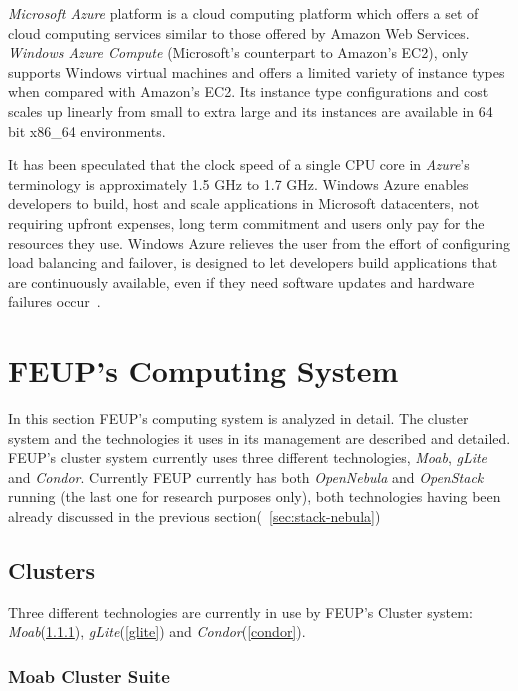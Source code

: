 \textit{Microsoft Azure} platform is a cloud computing platform which offers a set of cloud computing services similar to those offered by Amazon Web Services. \textit{Windows Azure Compute} (Microsoft's counterpart to Amazon's EC2), only supports Windows virtual machines and offers a limited variety of instance types when compared with Amazon's EC2. Its instance type configurations and cost scales up linearly from small to extra large and its instances are available in 64 bit x86\_64 environments. 

It has been speculated that the clock speed of a single CPU core in \textit{Azure}'s terminology is approximately 1.5 GHz to 1.7 GHz.\cite{azure-paper}
Windows Azure enables developers to build, host and scale applications in Microsoft datacenters, not requiring upfront expenses, long term commitment and users only pay for the resources they use. 
Windows Azure relieves the user from the effort of configuring load balancing and failover, is designed to let developers build applications that are continuously available, even if they need software updates and hardware failures occur~\cite{azure}.

\section{FEUP's Computing System}\label{feup}

In this section FEUP's computing system is analyzed in detail. The cluster system and the technologies it uses in its management are described and detailed. FEUP's cluster system currently uses three different technologies, \textit{Moab}, \textit{gLite} and \textit{Condor}.
Currently FEUP currently has both \textit{OpenNebula} and \textit{OpenStack} running (the last one for research purposes only), both technologies having been already discussed in the previous section(~\ref{sec:stack-nebula})


\subsection{Clusters}\label{clusters}

Three different technologies are currently in use by FEUP's Cluster system: \textit{Moab}(\ref{moab}), \textit{gLite}(\ref{glite}) and \textit{Condor}(\ref{condor}).

\subsubsection{Moab Cluster Suite}\label{moab}

